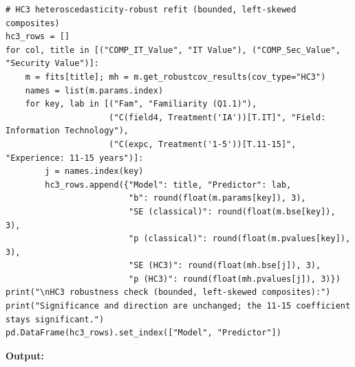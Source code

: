 {\begin{verbatim}
# HC3 heteroscedasticity-robust refit (bounded, left-skewed composites)
hc3_rows = []
for col, title in [("COMP_IT_Value", "IT Value"), ("COMP_Sec_Value", "Security Value")]:
    m = fits[title]; mh = m.get_robustcov_results(cov_type="HC3")
    names = list(m.params.index)
    for key, lab in [("Fam", "Familiarity (Q1.1)"),
                     ("C(field4, Treatment('IA'))[T.IT]", "Field: Information Technology"),
                     ("C(expc, Treatment('1-5'))[T.11-15]", "Experience: 11-15 years")]:
        j = names.index(key)
        hc3_rows.append({"Model": title, "Predictor": lab,
                         "b": round(float(m.params[key]), 3),
                         "SE (classical)": round(float(m.bse[key]), 3),
                         "p (classical)": round(float(m.pvalues[key]), 3),
                         "SE (HC3)": round(float(mh.bse[j]), 3),
                         "p (HC3)": round(float(mh.pvalues[j]), 3)})
print("\nHC3 robustness check (bounded, left-skewed composites):")
print("Significance and direction are unchanged; the 11-15 coefficient stays significant.")
pd.DataFrame(hc3_rows).set_index(["Model", "Predictor"])
\end{verbatim}}
\noindent\textbf{Output:}\nopagebreak
